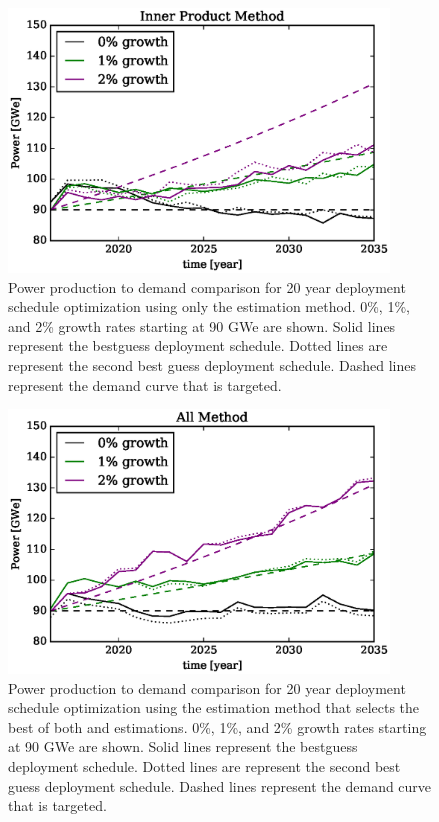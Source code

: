 \begin{figure}[htb]
\centering
\includegraphics[width=0.9\textwidth]{demand-product-inner-product.eps}
\caption{Power production to demand comparison for 20 year deployment 
schedule optimization using only the \innerprod estimation method.
0\%, 1\%, and 2\% growth rates starting at 90 GWe are shown. Solid lines 
represent the bestguess deployment schedule.  Dotted lines are represent 
the second best guess deployment schedule. Dashed lines represent the 
demand curve that is targeted.
}
\label{demand-product-inner-product}
\end{figure}

\begin{figure}[htb]
\centering
\includegraphics[width=0.9\textwidth]{demand-product-all.eps}
\caption{Power production to demand comparison for 20 year deployment 
schedule optimization using the \allflag estimation method that selects the 
best of both \stochastic and \innerprod estimations.
0\%, 1\%, and 2\% growth rates starting at 90 GWe are shown. Solid lines 
represent the bestguess deployment schedule.  Dotted lines are represent 
the second best guess deployment schedule. Dashed lines represent the 
demand curve that is targeted.}
\label{demand-product-all}
\end{figure}

